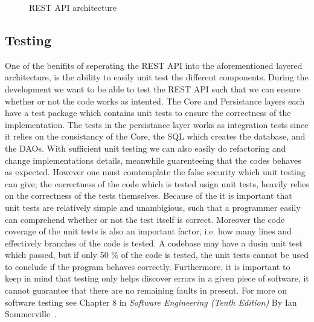 \begin{figure}[h]
    \centering
    
    \caption{REST API architecture}
    \label{fig:rest-architecture}
\end{figure}


\subsection{Testing}
One of the benifits of seperating the REST API into the aforementioned layered architecture, is the ability to easily unit test the different components.
During the development we want to be able to test the REST API such that we can ensure whether or not the code works as intented. 
The Core and Persistance layers each have a test package which contains unit tests to ensure the correctness of the implementation. 
The tests in the persistance layer works as integration tests since it relies on the consistancy of the Core, the SQL which creates the database, and the DAOs.
With sufficient unit testing we can also easily do refactoring and change implementations details, meanwhile guarenteeing that the codes behaves as expected.
However one must comtemplate the false security which unit testing can give; the correctness of the code which is tested usign unit tests, heavily relies on the correctness of the tests themselves.
Because of the it is important that unit tests are relatively simple and unambigious, such that a programmer easily can comprehend whether or not the test itself is correct.
Moreover the code coverage of the unit tests is also an important factor, i.e. how many lines and effectively branches of the code is tested.
A codebase may have a dusin unit test which passed, but if only 50 \% of the code is tested, the unit tests cannot be used to conclude if the program behaves correctly.
Furthermore, it is important to keep in mind that testing only helps discover errors in a given piece of software, it cannot guarantee that there are no remaining faults in present. For more on software testing see Chapter 8 in \textit{Software Engineering (Tenth Edition)} By Ian Sommerville~\cite[Chapter~8]{SEBOOK}.

